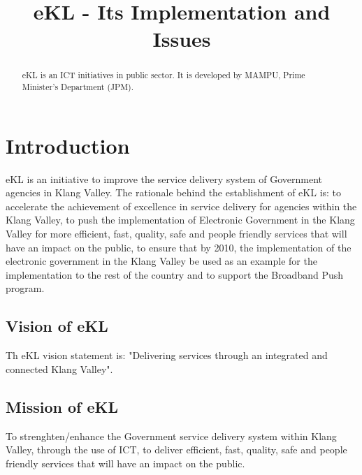 \documentclass[conference, compsoc]{IEEEtran}
\begin{document}
%
\title{eKL - Its Implementation and Issues}



\author{
}

\maketitle


\begin{abstract}
eKL is an ICT initiatives in public sector. It is developed by MAMPU, Prime Minister's Department (JPM).   

\end{abstract}


\section{Introduction}
eKL is an initiative to improve the service delivery system of Government agencies in Klang
Valley. The rationale behind the establishment of eKL is: to accelerate the achievement of excellence in service delivery for agencies within the Klang Valley, to push the implementation of Electronic Government in the Klang Valley for more efficient, fast, quality, safe and people friendly services that will have an impact on the public, to ensure that by 2010, the implementation of the electronic government in the Klang Valley be used as an example for the implementation to the rest of the country and to support the Broadband Push program.



\subsection{Vision of eKL}
Th eKL vision statement is: "Delivering services through an integrated and connected Klang Valley".

\subsection{Mission of eKL}
To strenghten/enhance the Government service delivery system within Klang Valley, through the use of ICT, to deliver efficient, fast, quality, safe and people friendly services that will have an impact on the public.
\end{document}
